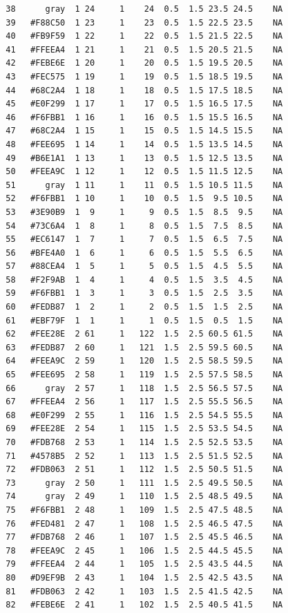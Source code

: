 \documentclass[12pt,twoside]{reedthesis}
\begin{document}
\begin{verbatim}
  38      gray  1 24     1    24  0.5  1.5 23.5 24.5    NA
  39   #F88C50  1 23     1    23  0.5  1.5 22.5 23.5    NA
  40   #FB9F59  1 22     1    22  0.5  1.5 21.5 22.5    NA
  41   #FFEEA4  1 21     1    21  0.5  1.5 20.5 21.5    NA
  42   #FEBE6E  1 20     1    20  0.5  1.5 19.5 20.5    NA
  43   #FEC575  1 19     1    19  0.5  1.5 18.5 19.5    NA
  44   #68C2A4  1 18     1    18  0.5  1.5 17.5 18.5    NA
  45   #E0F299  1 17     1    17  0.5  1.5 16.5 17.5    NA
  46   #F6FBB1  1 16     1    16  0.5  1.5 15.5 16.5    NA
  47   #68C2A4  1 15     1    15  0.5  1.5 14.5 15.5    NA
  48   #FEE695  1 14     1    14  0.5  1.5 13.5 14.5    NA
  49   #B6E1A1  1 13     1    13  0.5  1.5 12.5 13.5    NA
  50   #FEEA9C  1 12     1    12  0.5  1.5 11.5 12.5    NA
  51      gray  1 11     1    11  0.5  1.5 10.5 11.5    NA
  52   #F6FBB1  1 10     1    10  0.5  1.5  9.5 10.5    NA
  53   #3E90B9  1  9     1     9  0.5  1.5  8.5  9.5    NA
  54   #73C6A4  1  8     1     8  0.5  1.5  7.5  8.5    NA
  55   #EC6147  1  7     1     7  0.5  1.5  6.5  7.5    NA
  56   #BFE4A0  1  6     1     6  0.5  1.5  5.5  6.5    NA
  57   #88CEA4  1  5     1     5  0.5  1.5  4.5  5.5    NA
  58   #F2F9AB  1  4     1     4  0.5  1.5  3.5  4.5    NA
  59   #F6FBB1  1  3     1     3  0.5  1.5  2.5  3.5    NA
  60   #FEDB87  1  2     1     2  0.5  1.5  1.5  2.5    NA
  61   #EBF79F  1  1     1     1  0.5  1.5  0.5  1.5    NA
  62   #FEE28E  2 61     1   122  1.5  2.5 60.5 61.5    NA
  63   #FEDB87  2 60     1   121  1.5  2.5 59.5 60.5    NA
  64   #FEEA9C  2 59     1   120  1.5  2.5 58.5 59.5    NA
  65   #FEE695  2 58     1   119  1.5  2.5 57.5 58.5    NA
  66      gray  2 57     1   118  1.5  2.5 56.5 57.5    NA
  67   #FFEEA4  2 56     1   117  1.5  2.5 55.5 56.5    NA
  68   #E0F299  2 55     1   116  1.5  2.5 54.5 55.5    NA
  69   #FEE28E  2 54     1   115  1.5  2.5 53.5 54.5    NA
  70   #FDB768  2 53     1   114  1.5  2.5 52.5 53.5    NA
  71   #4578B5  2 52     1   113  1.5  2.5 51.5 52.5    NA
  72   #FDB063  2 51     1   112  1.5  2.5 50.5 51.5    NA
  73      gray  2 50     1   111  1.5  2.5 49.5 50.5    NA
  74      gray  2 49     1   110  1.5  2.5 48.5 49.5    NA
  75   #F6FBB1  2 48     1   109  1.5  2.5 47.5 48.5    NA
  76   #FED481  2 47     1   108  1.5  2.5 46.5 47.5    NA
  77   #FDB768  2 46     1   107  1.5  2.5 45.5 46.5    NA
  78   #FEEA9C  2 45     1   106  1.5  2.5 44.5 45.5    NA
  79   #FFEEA4  2 44     1   105  1.5  2.5 43.5 44.5    NA
  80   #D9EF9B  2 43     1   104  1.5  2.5 42.5 43.5    NA
  81   #FDB063  2 42     1   103  1.5  2.5 41.5 42.5    NA
  82   #FEBE6E  2 41     1   102  1.5  2.5 40.5 41.5    NA

\end{verbatim}
\end{document}

